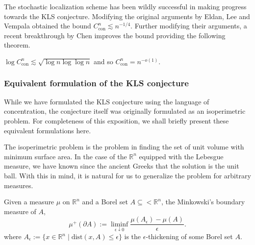 
The stochastic localization scheme has been wildly successful in making progress towards the KLS conjecture. 
Modifying the original arguments by Eldan, Lee and Vempala \cite{Lee_2016} obtained the bound 
\(C_{\text{con}}^n \lesssim n^{-1 / 4}\). Further modifying their arguments, a recent breakthrough by 
Chen \cite{Chen_2020} improves the bound providing the following theorem. 

\begin{theorem}
  \(\log C_{\text{con}}^n \lesssim \sqrt{\log n \log \log n}\) and so \(C_{\text{con}}^n = n^{-o(1)}\).
\end{theorem}


\subsubsection{Equivalent formulation of the KLS conjecture}

While we have formulated the KLS conjecture using the language of concentration, the conjecture itself 
was originally formulated as an isoperimetric problem. For completeness of this exposition, we shall 
briefly present these equivalent formulations here.  

The isoperimetric problem is the problem in finding 
the set of unit volume with minimum surface area. In the case of the \(\mathbb{R}^n\) equipped with the 
Lebesgue measure, we have known since the ancient Greeks \cite{iso_hist} that the solution is the unit ball. 
With this in mind, it is natural for us to generalize the problem for arbitrary measures. 

\begin{definition}
  Given a measure \(\mu\) on \(\mathbb{R}^n\) and a Borel set \(A \subseteq <\mathbb{R}^n\), the Minkowski's 
  boundary measure of \(A\), 
  \[\mu^+(\partial A) := \liminf_{\epsilon \downarrow 0} \frac{\mu(A_\epsilon) - \mu(A)}{\epsilon}.\]
  where \(A_\epsilon := \{x \in \mathbb{R}^n \mid \text{dist}(x, A) \le \epsilon\}\) is the 
  \(\epsilon\)-thickening of some Borel set \(A\). 
\end{definition}

